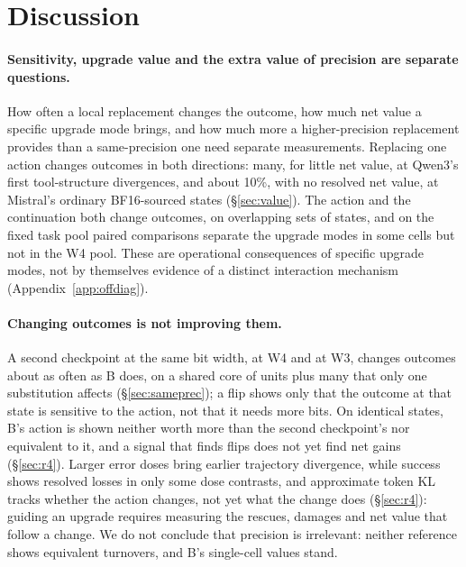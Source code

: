 \section{Discussion}
\label{sec:discussion}

\paragraph{Sensitivity, upgrade value and the extra value of precision are separate questions.} How often a local replacement changes the outcome, how much net value a specific upgrade mode brings, and how much more a higher-precision replacement provides than a same-precision one need separate measurements. Replacing one action changes outcomes in both directions: many, for little net value, at Qwen3's first tool-structure divergences, and about 10\%, with no resolved net value, at Mistral's ordinary BF16-sourced states (\S\ref{sec:value}). The action and the continuation both change outcomes, on overlapping sets of states, and on the fixed task pool paired comparisons separate the upgrade modes in some cells but not in the W4 pool. These are operational consequences of specific upgrade modes, not by themselves evidence of a distinct interaction mechanism (Appendix~\ref{app:offdiag}). %

\paragraph{Changing outcomes is not improving them.} A second checkpoint at the same bit width, at W4 and at W3, changes outcomes about as often as B does, on a shared core of units plus many that only one substitution affects (\S\ref{sec:sameprec}); a flip shows only that the outcome at that state is sensitive to the action, not that it needs more bits. On identical states, B's action is shown neither worth more than the second checkpoint's nor equivalent to it, and a signal that finds flips does not yet find net gains (\S\ref{sec:r4}). Larger error doses bring earlier trajectory divergence, while success shows resolved losses in only some dose contrasts, and approximate token KL tracks whether the action changes, not yet what the change does (\S\ref{sec:r4}): guiding an upgrade requires measuring the rescues, damages and net value that follow a change. We do not conclude that precision is irrelevant: neither reference shows equivalent turnovers, and B's single-cell values stand. %

